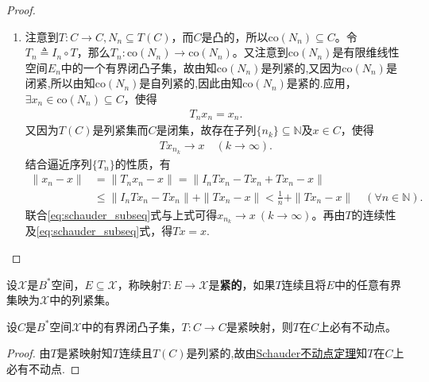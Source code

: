 \documentclass[../../main.tex]{subfiles}%
\begin{document}
\begin{proof}
\begin{enumerate}[(1)]
\begin{align*}
&= \sum_{\substack{y \in B(y_i, \frac{1}{n})}} \|y_i - y\| \lambda_i(y) + \sum_{\substack{y \notin B(y_i, \frac{1}{n})}} \|y_i - y\| \lambda_i(y) \\
&<\frac{1}{n}\sum_{i=1}^{r_n}{\lambda _i\left( y \right)}+0=\frac{1}{n}+0=\frac{1}{n}.
\end{align*}
\item 注意到$T: C \to C, N_n \subseteq T(C)$，而$C$是凸的，所以$\mathrm{co}(N_n) \subseteq C$。令$T_n \triangleq I_n \circ T$，那么$T_n: \mathrm{co}(N_n) \to \mathrm{co}(N_n)$。又注意到$\mathrm{co}(N_n)$是有限维线性空间$E_n$中的一个有界闭凸子集，故由知$\mathrm{co}(N_n)$是列紧的,又因为$\mathrm{co}(N_n)$是闭紧,所以由知$\mathrm{co}(N_n)$是自列紧的,因此由知$\mathrm{co}(N_n)$是紧的.应用，$\exists x_n \in \mathrm{co}(N_n) \subseteq C$，使得
\begin{align*}
T_n x_n = x_n. 
\end{align*}
又因为$T(C)$是列紧集而$C$是闭集，故存在子列$\{n_k\}\subseteq\mathbb{N}$及$x\in C$，使得
\begin{align}
Tx_{n_k}\to x\quad (k\to\infty).
\label{eq:schauder_subseq}
\end{align}
结合逼近序列$\{T_n\}$的性质，有
\begin{align*}
\|x_n - x\| &= \|T_nx_n - x\| 
= \|I_nTx_n - Tx_n + Tx_n - x\| \\
&\leqslant \|I_nTx_n - Tx_n\| + \|Tx_n - x\| 
< \frac{1}{n} + \|Tx_n - x\|\quad (\forall n\in\mathbb{N}).
\end{align*}
联合\eqref{eq:schauder_subseq}式与上式可得$x_{n_k}\to x\ (k\to\infty)$。再由$T$的连续性及\eqref{eq:schauder_subseq}式，得$Tx=x$.
\end{enumerate}
\end{proof}

\begin{definition}
设$\mathscr{X}$是$B^*$空间，$E\subseteq\mathscr{X}$，称映射$T:E\to\mathscr{X}$是\textbf{紧的}，如果$T$连续且将$E$中的任意有界集映为$\mathscr{X}$中的列紧集。
\end{definition}

\begin{corollary}\label{corollary:泛函分析--推论1.5.121}
设$C$是$B^*$空间$\mathscr{X}$中的有界闭凸子集，$T:C\to C$是紧映射，则$T$在$C$上必有不动点。
\end{corollary}
\begin{proof}

由$T$是紧映射知$T$连续且$T(C)$是列紧的,故由\hyperref[theorem:泛函分析---Schauder不动点定理]{Schauder不动点定理}知$T$在$C$上必有不动点.
\end{proof}
\end{document}
